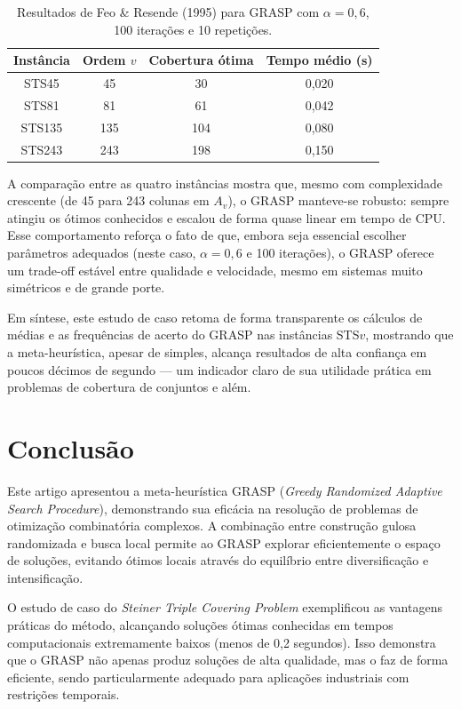 \documentclass[a4paper, 12pt]{article}
\begin{document}
\begin{table}[h!]
  \centering
  \begin{tabular}{c c c c}
    \toprule
    Instância & Ordem $v$ & Cobertura ótima & Tempo médio (s) \\
    \midrule
    STS45  &   45  &   30  & 0,020 \\
    STS81  &   81  &   61  & 0,042 \\
    STS135 &  135  &  104  & 0,080 \\
    STS243 &  243  &  198  & 0,150 \\
    \bottomrule
  \end{tabular}
  \caption{Resultados de Feo \& Resende (1995) para GRASP com $\alpha=0{,}6$, 100 iterações e 10 repetições.}
  \label{tab:feoresende-sts}
\end{table}

A comparação entre as quatro instâncias mostra que, mesmo com complexidade crescente (de 45 para 243 colunas em $A_v$), o GRASP manteve-se robusto: sempre atingiu os ótimos conhecidos e escalou de forma quase linear em tempo de CPU. Esse comportamento reforça o fato de que, embora seja essencial escolher parâmetros adequados (neste caso, $\alpha=0{,}6$ e 100 iterações), o GRASP oferece um trade-off estável entre qualidade e velocidade, mesmo em sistemas muito simétricos e de grande porte.

Em síntese, este estudo de caso retoma de forma transparente os cálculos de médias e as frequências de acerto do GRASP nas instâncias STS$v$, mostrando que a meta-heurística, apesar de simples, alcança resultados de alta confiança em poucos décimos de segundo — um indicador claro de sua utilidade prática em problemas de cobertura de conjuntos e além.


\section{Conclusão}

Este artigo apresentou a meta-heurística GRASP (\textit{Greedy Randomized Adaptive Search Procedure}), demonstrando sua eficácia na resolução de problemas de otimização combinatória complexos. A combinação entre construção gulosa randomizada e busca local permite ao GRASP explorar eficientemente o espaço de soluções, evitando ótimos locais através do equilíbrio entre diversificação e intensificação.

O estudo de caso do \textit{Steiner Triple Covering Problem} exemplificou as vantagens práticas do método, alcançando soluções ótimas conhecidas em tempos computacionais extremamente baixos (menos de 0,2 segundos). Isso demonstra que o GRASP não apenas produz soluções de alta qualidade, mas o faz de forma eficiente, sendo particularmente adequado para aplicações industriais com restrições temporais.
\end{document}
